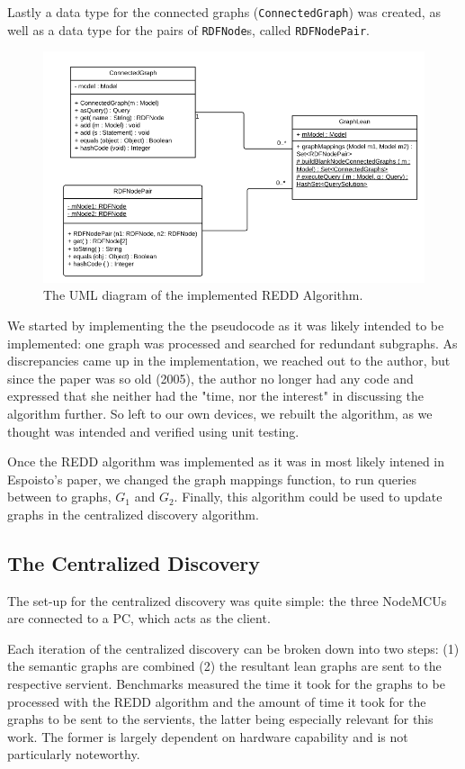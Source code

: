 Lastly a data type for the connected graphs (\texttt{ConnectedGraph}) was created, as well as a data type for the pairs of \texttt{RDFNode}s, called \texttt{RDFNodePair}.

\begin{figure}[h]
\centering
\includegraphics[width=\textwidth]{Figures/REDDuml.png}
\caption{The UML diagram of the implemented REDD Algorithm.}
\end{figure}

We started by implementing the the pseudocode as it was likely intended to be implemented: one graph was processed and searched for redundant subgraphs. As discrepancies came up in the implementation, we reached out to the author, but since the paper was so old (2005), the author no longer had any code and expressed that she neither had the "time, nor the interest" in discussing the algorithm further. So left to our own devices, we rebuilt the algorithm, as we thought was intended and verified using unit testing.

Once the REDD algorithm was implemented as it was in most likely intened in Espoisto's paper, we changed the graph mappings function, to run queries between to graphs, $G_1$ and $G_2$. Finally, this algorithm could be used to update graphs in the centralized discovery algorithm.


\subsection{The Centralized Discovery}

The set-up for the centralized discovery was quite simple: the three NodeMCUs are connected to a PC, which acts as the client.

Each iteration of the centralized discovery can be broken down into two steps: (1) the semantic graphs are combined (2) the resultant lean graphs are sent to the respective servient. Benchmarks measured the time it took for the graphs to be processed with the REDD algorithm and the amount of time it took for the graphs to be sent to the servients, the latter being especially relevant for this work. The former is largely dependent on hardware capability and is not particularly noteworthy.

